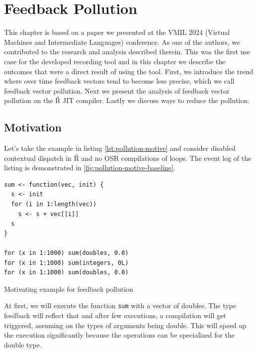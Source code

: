 \chapter{Feedback Pollution}

\begin{chapterabstract}
  This chapter is based on a paper we presented at the VMIL 2024 (Virtual Machines and Intermediate Languages) conference\cite{feedback-vmil}. As one of the authors, we contributed to the research and analysis described therein. This was the first use case for the developed recording tool and in this chapter we describe the outcomes that were a direct result of using the tool. First, we introduce the trend where over time feedback vectors tend to become less precise, which we call feedback vector pollution. Next we present the analysis of feedback vector pollution on the Ř JIT compiler. Lastly we discuss ways to reduce the pollution.
\end{chapterabstract}

\section{Motivation}

Let's take the example in listing \ref{lst:pollution-motive} and consider disabled contextual dispatch in Ř and no OSR compilations of loops. The event log of the listing is demonstrated in \ref{fig:pollution-motive-baseline}.

\begin{listing}[H]
	\begin{verbatim}
sum <- function(vec, init) {
  s <- init
  for (i in 1:length(vec))
    s <- s + vec[[i]]
  s
}

for (x in 1:1000) sum(doubles, 0.0)
for (x in 1:1000) sum(integers, 0L)
for (x in 1:1000) sum(doubles, 0.0)
  \end{verbatim}
	\caption{Motivating example for feedback pollution}\label{lst:pollution-motive}
\end{listing}

At first, we will execute the function \texttt{sum} with a vector of doubles. The type feedback will reflect that and after few executions, a compilation will get triggered, assuming on the types of arguments being double. This will speed up the execution significantly because the operations can be specialized for the double type.

